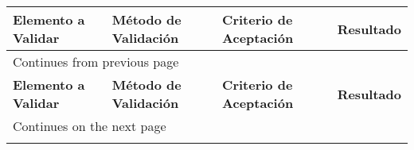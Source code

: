 \renewcommand{\arraystretch}{1.4}
\begin{longtable}{|p{3.7cm}|p{3.7cm}|p{3.8cm}|>{\centering\arraybackslash}m{2cm}|}
    \hline
    \textbf{Elemento a Validar} & \textbf{Método de Validación} & \textbf{Criterio de Aceptación} & \textbf{Resultado} \\
    \hline
    \endfirsthead

    \multicolumn{3}{l}{\footnotesize Continues from previous page} \\
    \hline
    \textbf{Elemento a Validar} & \textbf{Método de Validación} & \textbf{Criterio de Aceptación} & \textbf{Resultado} \\
    \hline
    \endhead

    \hline
    \multicolumn{3}{l}{\footnotesize Continues on the next page} \\
    \endfoot

    \endlastfoot


\end{longtable}
